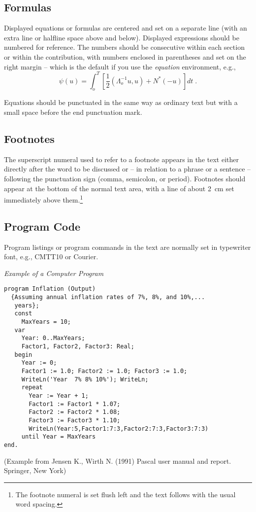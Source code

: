 \documentclass[runningheads,a4paper]{llncs}
\begin{document}
\subsection{Formulas}

Displayed equations or formulas are centered and set on a separate
line (with an extra line or halfline space above and below). Displayed
expressions should be numbered for reference. The numbers should be
consecutive within each section or within the contribution,
with numbers enclosed in parentheses and set on the right margin --
which is the default if you use the \emph{equation} environment, e.g.,
\begin{equation}
  \psi (u) = \int_{o}^{T} \left[\frac{1}{2}
  \left(\Lambda_{o}^{-1} u,u\right) + N^{\ast} (-u)\right] dt \;  .
\end{equation}

Equations should be punctuated in the same way as ordinary
text but with a small space before the end punctuation mark.

\subsection{Footnotes}

The superscript numeral used to refer to a footnote appears in the text
either directly after the word to be discussed or -- in relation to a
phrase or a sentence -- following the punctuation sign (comma,
semicolon, or period). Footnotes should appear at the bottom of
the
normal text area, with a line of about 2~cm set
immediately above them.\footnote{The footnote numeral is set flush left
and the text follows with the usual word spacing.}

\subsection{Program Code}

Program listings or program commands in the text are normally set in
typewriter font, e.g., CMTT10 or Courier.

\medskip

\noindent
{\it Example of a Computer Program}
\begin{verbatim}
program Inflation (Output)
  {Assuming annual inflation rates of 7%, 8%, and 10%,...
   years};
   const
     MaxYears = 10;
   var
     Year: 0..MaxYears;
     Factor1, Factor2, Factor3: Real;
   begin
     Year := 0;
     Factor1 := 1.0; Factor2 := 1.0; Factor3 := 1.0;
     WriteLn('Year  7% 8% 10%'); WriteLn;
     repeat
       Year := Year + 1;
       Factor1 := Factor1 * 1.07;
       Factor2 := Factor2 * 1.08;
       Factor3 := Factor3 * 1.10;
       WriteLn(Year:5,Factor1:7:3,Factor2:7:3,Factor3:7:3)
     until Year = MaxYears
end.
\end{verbatim}
%
\noindent
{\small (Example from Jensen K., Wirth N. (1991) Pascal user manual and
report. Springer, New York)}
\end{document}
